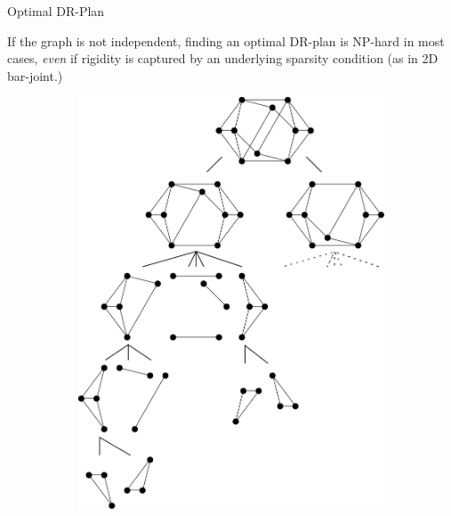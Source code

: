 \documentclass{beamer}
\begin{document}
\begin{frame}{Optimal DR-Plan}
    \small

    If the graph is not independent, finding an optimal DR-plan is NP-hard in most cases, \emph{even} if rigidity is captured by an underlying sparsity condition
    (as in 2D bar-joint.)

    \begin{figure}\centering
        \begin{subfigure}{.35\linewidth}\centering
            \includegraphics[width=\linewidth]{../../img/svg/new_overconstrained_optimal}
        \end{subfigure}
        \hspace{.1\linewidth}
        \begin{subfigure}{.35\linewidth}\centering

\end{subfigure}
\end{figure}
\end{frame}
\end{document}
